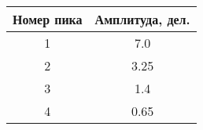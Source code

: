 \begin{tabular}{|c|c|}
\hline
Номер пика & Амплитуда, дел. \\ \hline
1 & 7.0 \\ \hline
2 & 3.25 \\ \hline
3 & 1.4 \\ \hline
4 & 0.65 \\ \hline
\end{tabular}
